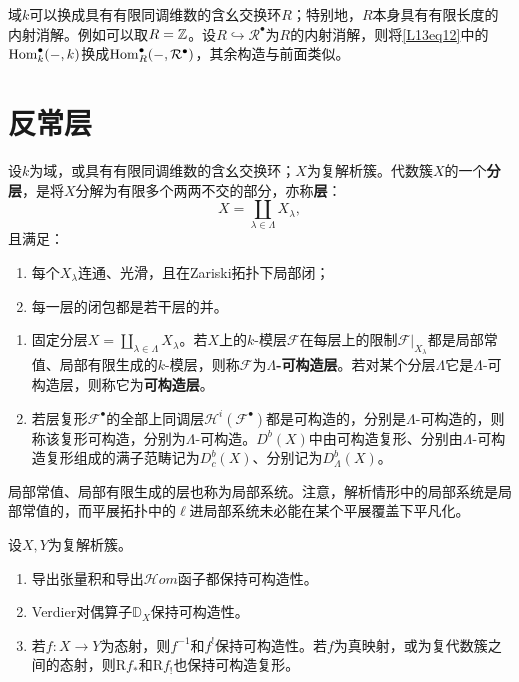 \begin{note}[L13S1O3]
域$k$可以换成具有有限同调维数的含幺交换环$R$；特别地，$R$本身具有有限长度的内射消解。例如可以取$R=\mathbb{Z}$。设$R\hookrightarrow\mathcal R^\bullet$为$R$的内射消解，则将\eqref{L13eq12}中的$\operatorname{Hom}_k^\bullet(-,k)$换成$\operatorname{Hom}_R^\bullet(-,\mathcal R^\bullet)$，其余构造与前面类似。
\end{note}
\section{反常层}\label{L13S2}
设$k$为域，或具有有限同调维数的含幺交换环；$X$为复解析簇。代数簇$X$的一个\textbf{分层}，是将$X$分解为有限多个两两不交的部分，亦称\textbf{层}：
\[X=\coprod_{\lambda\in\Lambda}X_\lambda,\]
且满足：
\begin{enumerate}[label=(\arabic*)]
\item 每个$X_\lambda$连通、光滑，且在Zariski拓扑下局部闭；
\item 每一层的闭包都是若干层的并。
\end{enumerate}
\begin{definition}\label{L13S2O1}
\begin{enumerate}[label=\arabic*.]
\item 固定分层$X=\coprod_{\lambda\in\Lambda}X_\lambda$。若$X$上的$k$-模层$\mathcal F$在每层上的限制$\mathcal F|_{X_\lambda}$都是局部常值、局部有限生成的$k$-模层，则称$\mathcal F$为\textbf{$\Lambda$-可构造层}。若对某个分层$\Lambda$它是$\Lambda$-可构造层，则称它为\textbf{可构造层}。
\item 若层复形$\mathcal F^\bullet$的全部上同调层$\mathcal H^i(\mathcal F^\bullet)$都是可构造的，分别是$\Lambda$-可构造的，则称该复形可构造，分别为$\Lambda$-可构造。$D^b(X)$中由可构造复形、分别由$\Lambda$-可构造复形组成的满子范畴记为$D_c^b(X)$、分别记为$D_\Lambda^b(X)$。
\end{enumerate}
\end{definition}
\begin{note}[L13S2O2]
局部常值、局部有限生成的层也称为局部系统。注意，解析情形中的局部系统是局部常值的，而平展拓扑中的$\ell$进局部系统未必能在某个平展覆盖下平凡化。
\end{note}
\begin{proposition}\label{L13S2O3}
设$X,Y$为复解析簇。
\begin{enumerate}[label=(\arabic*)]
\item 导出张量积和导出$\mathcal Hom$函子都保持可构造性。
\item Verdier对偶算子$\mathbb D_X$保持可构造性。
\item 若$f:X\to Y$为态射，则$f^{-1}$和$f^!$保持可构造性。若$f$为真映射，或为复代数簇之间的态射，则$\mathrm Rf_*$和$\mathrm Rf_!$也保持可构造复形。
\end{enumerate}
\end{proposition}
